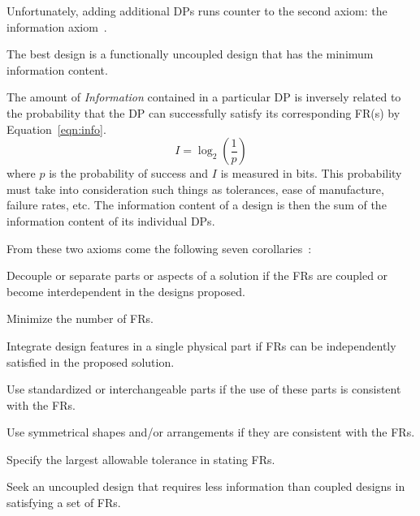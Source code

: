 Unfortunately, adding additional DPs runs counter to the second axiom: the information axiom~\cite{suh}.

\begin{axiom}
  The best design is a functionally uncoupled design that has the minimum information content.
\end{axiom}

The amount of \emph{Information} contained in a particular DP is inversely related to the probability that the DP
can successfully satisfy its corresponding FR(s) by Equation~\ref{eqn:info}.
\begin{equation}
  \label{eqn:info}
  I=\log_2\left(\frac{1}{p}\right)
\end{equation}
where \(p\) is the probability of success and \(I\) is measured in bits.  This probability must take into
consideration such things as tolerances, ease of manufacture, failure rates, etc.  The information content of a
design is then the sum of the information content of its individual DPs.

From these two axioms come the following seven corollaries~\cite{suh}:
\begin{corollary}
  \label{cor:decouple}
  Decouple or separate parts or aspects of a solution if the FRs are coupled or become interdependent in the
  designs proposed.
\end{corollary}
\begin{corollary}
  \label{cor:minfrs}
  Minimize the number of FRs.
\end{corollary}
\begin{corollary}
  \label{cor:integrate}
  Integrate design features in a single physical part if FRs can be independently satisfied in the proposed
  solution.
\end{corollary}
\begin{corollary}
  \label{cor:standard}
  Use standardized or interchangeable parts if the use of these parts is consistent with the FRs.
\end{corollary}
\begin{corollary}
  \label{cor:shapes}
  Use symmetrical shapes and/or arrangements if they are consistent with the FRs.
\end{corollary}
\begin{corollary}
  \label{cor:tolerance}
  Specify the largest allowable tolerance in stating FRs.
\end{corollary}
\begin{corollary}
  \label{cor:uncoupled}
  Seek an uncoupled design that requires less information than coupled designs in satisfying a set of FRs.
\end{corollary}

